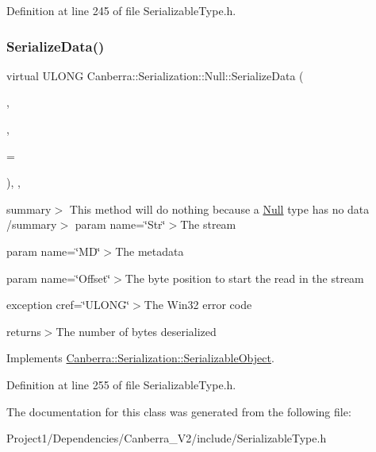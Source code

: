 Definition at line 245 of file Serializable\+Type.\+h.

\mbox{\label{class_canberra_1_1_serialization_1_1_null_a04a4447561d41d4fee429eea43badc4f_a04a4447561d41d4fee429eea43badc4f}} 
\subsubsection{\texorpdfstring{Serialize\+Data()}{SerializeData()}}
{\footnotesize\ttfamily virtual U\+L\+O\+NG Canberra\+::\+Serialization\+::\+Null\+::\+Serialize\+Data (\begin{DoxyParamCaption}\item[{\hyperlink{class_canberra_1_1_utility_1_1_core_1_1_byte_stream}{Canberra\+::\+Utility\+::\+Core\+::\+Byte\+Stream} \&}]{,  }\item[{const \hyperlink{class_canberra_1_1_serialization_1_1_meta_data}{Meta\+Data} \&}]{,  }\item[{const L\+O\+NG}]{ = {} }\end{DoxyParamCaption})\hspace{0.3cm}{\ttfamily [inline]}, {\ttfamily [protected]}, {\ttfamily [virtual]}}

summary$>$ This method will do nothing because a \hyperlink{class_canberra_1_1_serialization_1_1_null}{Null} type has no data /summary$>$ param name=\char`\"{}\+Str\char`\"{}$>$The stream

param name=\char`\"{}\+M\+D\char`\"{}$>$The metadata

param name=\char`\"{}\+Offset\char`\"{}$>$The byte position to start the read in the stream

exception cref=\char`\"{}\+U\+L\+O\+N\+G\char`\"{}$>$The Win32 error code

returns$>$The number of bytes deserialized

Implements \hyperlink{class_canberra_1_1_serialization_1_1_serializable_object}{Canberra\+::\+Serialization\+::\+Serializable\+Object}.



Definition at line 255 of file Serializable\+Type.\+h.



The documentation for this class was generated from the following file\+:\begin{DoxyCompactItemize}
\item 
Project1/\+Dependencies/\+Canberra\+\_\+\+V2/include/Serializable\+Type.\+h\end{DoxyCompactItemize}
